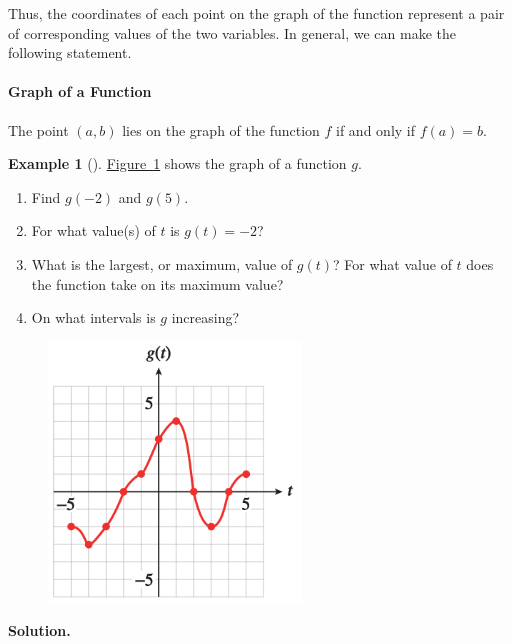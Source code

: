 \documentclass[10pt,]{book}
\theoremstyle{plain}
\theoremstyle{definition}
\theoremstyle{definition}
\newtheorem{example}[theorem]{Example}
\numberwithin{equation}{section}
\begin{document}
\par
Thus, the coordinates of each point on the graph of the function represent a pair of corresponding
values of the two variables. In general, we can make the following statement.%
\typeout{************************************************}
\typeout{************************************************}
\paragraph[Graph of a Function]{Graph of a Function}\label{paragraphs-8}
The point \((a, b)\) lies on the graph of the function \(f\) if and only if \(f(a)=b\).
%
\begin{example}[]\label{example-function-graph}
\hyperref[fig-function]{Figure~\ref{fig-function}} shows the graph of a function \(g\).
    \leavevmode%
\begin{enumerate}[label=*\alph**]
\item\hypertarget{li-121}{}Find \(g(−2)\) and \(g(5)\).\item\hypertarget{li-122}{}For what value(s) of \(t\) is \(g(t) = −2\)?\item\hypertarget{li-123}{}What is the largest, or maximum, value of \(g(t)\)? For what value of \(t\) does the function take on its maximum value?\item\hypertarget{li-124}{}On what intervals is \(g\) increasing?\end{enumerate}
%
\leavevmode%
\begin{figure}
\centering
\includegraphics[width=0.60\textwidth,]{images/fig-function.svg}\caption{\label{fig-function}}
\end{figure}
\par\medskip\noindent%
\textbf{Solution.}\quad \leavevmode%

\end{example}
\end{document}
